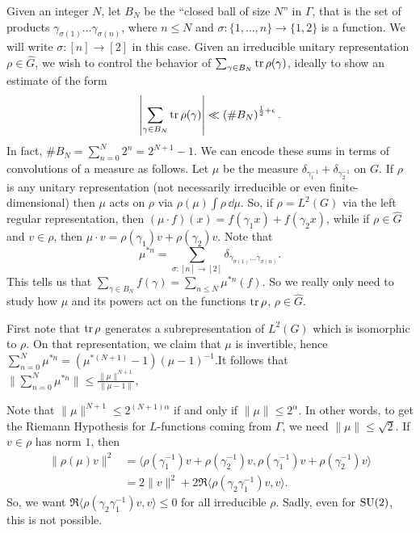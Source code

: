 Given an integer $N$, let $B_N$ be the ``closed ball of size $N$'' in $\Gamma$, 
that is the set of products $\gamma_{\sigma(1)} \dots \gamma_{\sigma(n)}$, 
where $n\leqslant N$ and $\sigma\colon \{1,\dots,n\} \to \{1,2\}$ is a 
function. We will write $\sigma\colon [n] \to [2]$ in this case. Given an 
irreducible unitary representation $\rho\in \widehat G$, we wish to control 
the behavior of $\sum_{\gamma\in B_N} \operatorname{tr}\rho(\gamma)$, ideally to show an 
estimate of the form 
\[
	\left| \sum_{\gamma\in B_N} \operatorname{tr}\rho(\gamma)\right| \ll \left(\# B_N\right)^{\frac 1 2 + \epsilon} .
\]
In fact, $\# B_N = \sum_{n=0}^N 2^n = 2^{N+1} - 1$. We can encode these sums 
in terms of convolutions of a measure as follows. Let $\mu$ be the measure 
$\delta_{\gamma_1^{-1}} + \delta_{\gamma_2^{-1}}$ on $G$. 
If $\rho$ is any unitary representation (not necessarily irreducible or even 
finite-dimensional) then $\mu$ acts on $\rho$ via 
$\rho(\mu) \int \rho\, \dd\mu$. So, if $\rho = L^2(G)$ via the left regular 
representation, then $(\mu\cdot f)(x) = f(\gamma_1 x) + f(\gamma_2 x)$, while 
if $\rho\in \widehat G$ and $v\in \rho$, then 
$\mu\cdot v = \rho(\gamma_1) v + \rho(\gamma_2) v$. Note that 
\[
	\mu^{\ast n} = \sum_{\sigma\colon [n] \to [2]} \delta_{\gamma_{\sigma(1)} \dots \gamma_{\sigma(n)}} .
\]
This tells us that 
$\sum_{\gamma\in B_N} f(\gamma) = \sum_{n\leqslant N} \mu^{\ast n}(f)$. So 
we really only need to study how $\mu$ and its powers act on the functions 
$\operatorname{tr}\rho$, $\rho\in \widehat G$. 

First note that $\operatorname{tr}\rho$ generates a subrepresentation of $L^2(G)$ which is 
isomorphic to $\rho$. On that representation, we claim that $\mu$ is 
invertible, hence 
$\sum_{n=0}^N \mu^{\ast n} = (\mu^{\ast(N+1)} - 1)(\mu - 1)^{-1}$.It 
follows that 
$\| \sum_{n=0}^N \mu^{\ast n}\| \leqslant \frac{\|\mu\|^{N+1}}{\|\mu - 1\|}$, 

Note that $\|\mu\|^{N+1} \leqslant 2^{(N+1)\alpha}$ if and only if 
$\|\mu\| \leqslant 2^\alpha$. In other words, to get the Riemann Hypothesis for 
$L$-functions coming from $\Gamma$, we need $\|\mu\| \leqslant \sqrt 2$. 
If $v\in \rho$ has norm $1$, then 
\begin{align*}
	\|\rho(\mu) v\|^2
		&= \langle \rho(\gamma_1^{-1}) v + \rho(\gamma_2^{-1}) v, \rho(\gamma_1^{-1}) v + \rho(\gamma_2^{-1}) v\rangle \\
		&= 2\|v\|^2 + 2\Re \langle \rho(\gamma_2 \gamma_1^{-1}) v,v\rangle .
\end{align*}
So, we want $\Re \langle \rho(\gamma_2 \gamma_1^{-1}) v,v\rangle \leqslant 0$ 
for all irreducible $\rho$. Sadly, even for $\operatorname{SU}(2)$, this is not possible. 

